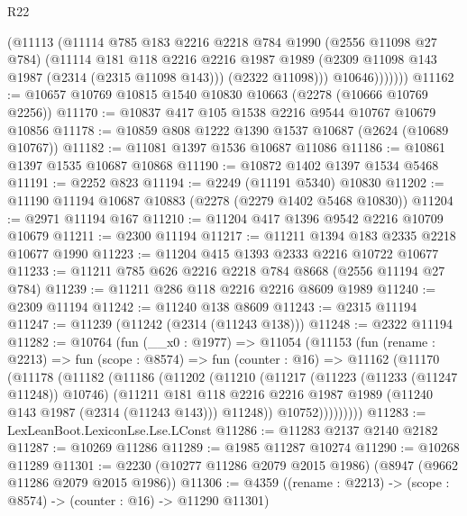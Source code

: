 \begin{lexlean}{R22}
\begin{coremodule}
                (@11113
                  (@11114
                    @785
                    @183
                    @2216
                    @2218
                    @784
                    @1990
                    (@2556 @11098 @27 @784)
                    (@11114
                      @181
                      @118
                      @2216
                      @2216
                      @1987
                      @1989
                      (@2309 @11098 @143 @1987 (@2314 (@2315 @11098 @143)))
                      (@2322 @11098)))
                  @10646)))))))
@11162 := @10657 @10769 @10815 @1540 @10830 @10663 (@2278 (@10666 @10769 @2256))
@11170 := @10837 @417 @105 @1538 @2216 @9544 @10767 @10679 @10856
@11178 := @10859 @808 @1222 @1390 @1537 @10687 (@2624 (@10689 @10767))
@11182 := @11081 @1397 @1536 @10687 @11086
@11186 := @10861 @1397 @1535 @10687 @10868
@11190 := @10872 @1402 @1397 @1534 @5468
@11191 := @2252 @823
@11194 := @2249 (@11191 @5340) @10830
@11202 := @11190 @11194 @10687 @10883 (@2278 (@2279 @1402 @5468 @10830))
@11204 := @2971 @11194 @167
@11210 := @11204 @417 @1396 @9542 @2216 @10709 @10679
@11211 := @2300 @11194
@11217 := @11211 @1394 @183 @2335 @2218 @10677 @1990
@11223 := @11204 @415 @1393 @2333 @2216 @10722 @10677
@11233 := @11211 @785 @626 @2216 @2218 @784 @8668 (@2556 @11194 @27 @784)
@11239 := @11211 @286 @118 @2216 @2216 @8609 @1989
@11240 := @2309 @11194
@11242 := @11240 @138 @8609
@11243 := @2315 @11194
@11247 := @11239 (@11242 (@2314 (@11243 @138)))
@11248 := @2322 @11194
@11282 := @10764
    (fun (__x0 : @1977) =>
    @11054
      (@11153
        (fun (rename : @2213) =>
        fun (scope : @8574) =>
        fun (counter : @16) =>
        @11162
          (@11170
            (@11178
              (@11182
                (@11186
                  (@11202
                    (@11210
                      (@11217
                        (@11223 (@11233 (@11247 @11248)) @10746)
                        (@11211
                          @181
                          @118
                          @2216
                          @2216
                          @1987
                          @1989
                          (@11240 @143 @1987 (@2314 (@11243 @143)))
                          @11248))
                      @10752)))))))))
@11283 := LexLeanBoot.LexiconLse.Lse.LConst
@11286 := @11283 @2137 @2140 @2182
@11287 := @10269 @11286
@11289 := @1985 @11287 @10274
@11290 := @10268 @11289
@11301 := @2230 (@10277 @11286 @2079 @2015 @1986) (@8947 (@9662 @11286 @2079 @2015 @1986))
@11306 := @4359 ((rename : @2213) -> (scope : @8574) -> (counter : @16) -> @11290 @11301)

\end{coremodule}
\end{lexlean}
